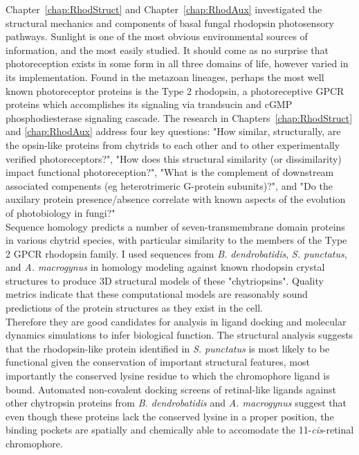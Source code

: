 \indent Chapter~\ref{chap:RhodStruct} and Chapter~\ref{chap:RhodAux} investigated the structural mechanics and components of basal fungal rhodopsin photosensory pathways. Sunlight is one of the most obvious environmental sources of information, and the most easily studied. It should come as no surprise that photoreception exists in some form in all three domains of life, however varied in its implementation. Found in the metazoan lineages, perhaps the most well known photoreceptor proteins is the Type 2 rhodopsin, a photoreceptive GPCR proteins which accomplishes its signaling via trandsucin and cGMP phosphodiesterase signaling cascade. The research in Chapters~\ref{chap:RhodStruct} and \ref{chap:RhodAux} address four key questions: "How similar, structurally, are the opsin-like proteins from chytrids to each other and to other experimentally verified photoreceptors?", "How does this structural similarity (or dissimilarity) impact functional photoreception?", "What is the complement of downstream associated compenents (eg heterotrimeric G-protein subunits)?", and "Do the auxilary protein presence/absence correlate with known aspects of the evolution of photobiology in fungi?" \\
\indent Sequence homology predicts a number of seven-transmembrane domain proteins in various chytrid species, with particular similarity to the members of the Type 2 GPCR rhodopsin family. I used sequences from \textit{B. dendrobatidis}, \textit{S. punctatus}, and \textit{A. macrogynus} in homology modeling against known rhodopsin crystal structures to produce 3D structural models of these "chytriopsins". Quality metrics indicate that these computational models are reasonably sound predictions of the protein structures as they exist in the cell.\\
\indent Therefore they are good candidates for analysis in ligand docking and molecular dynamics simulations to infer biological function. The structural analysis suggests that the rhodopsin-like protein identified in \textit{S. punctatus} is most likely to be functional given the conservation of important structural features, most importantly the conserved lysine residue to which the chromophore ligand is bound. Automated non-covalent docking screens of retinal-like ligands against other chytropsin proteins from \textit{B. dendrobatidis} and \textit{A. macrogynus} suggest that even though these proteins lack the conserved lysine in a proper position, the binding pockets are spatially and chemically able to accomodate the 11-\textit{cis}-retinal chromophore.\\
